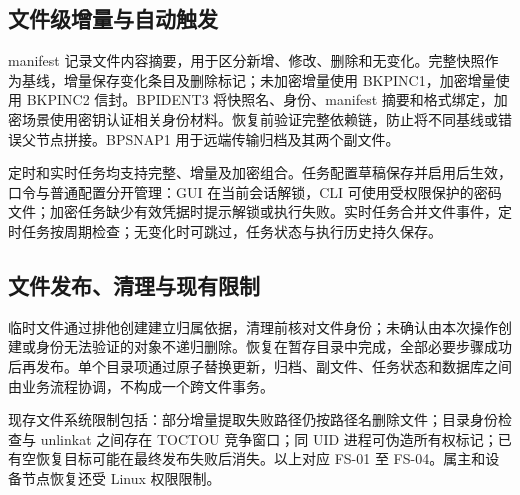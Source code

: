 \subsection{文件级增量与自动触发}
manifest 记录文件内容摘要，用于区分新增、修改、删除和无变化。完整快照作为基线，增量保存变化条目及删除标记；未加密增量使用 BKPINC1，加密增量使用 BKPINC2 信封。BPIDENT3 将快照名、身份、manifest 摘要和格式绑定，加密场景使用密钥认证相关身份材料。恢复前验证完整依赖链，防止将不同基线或错误父节点拼接。BPSNAP1 用于远端传输归档及其两个副文件。

定时和实时任务均支持完整、增量及加密组合。任务配置草稿保存并启用后生效，口令与普通配置分开管理：GUI 在当前会话解锁，CLI 可使用受权限保护的密码文件；加密任务缺少有效凭据时提示解锁或执行失败。实时任务合并文件事件，定时任务按周期检查；无变化时可跳过，任务状态与执行历史持久保存。

\subsection{文件发布、清理与现有限制}
临时文件通过排他创建建立归属依据，清理前核对文件身份；未确认由本次操作创建或身份无法验证的对象不递归删除。恢复在暂存目录中完成，全部必要步骤成功后再发布。单个目录项通过原子替换更新，归档、副文件、任务状态和数据库之间由业务流程协调，不构成一个跨文件事务。

现存文件系统限制包括：部分增量提取失败路径仍按路径名删除文件；目录身份检查与 unlinkat 之间存在 TOCTOU 竞争窗口；同 UID 进程可伪造所有权标记；已有空恢复目标可能在最终发布失败后消失。以上对应 FS-01 至 FS-04。属主和设备节点恢复还受 Linux 权限限制。
